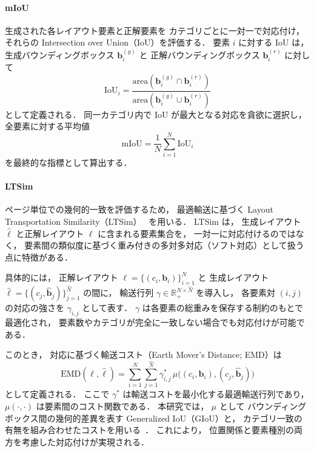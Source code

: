 \documentclass[a4j,12pt,dvipdfmx]{jsreport}
\begin{document}
\paragraph{mIoU}
生成された各レイアウト要素と正解要素を
カテゴリごとに一対一で対応付け，
それらの Intersection over Union（IoU）を評価する．
要素 $i$ に対する IoU は，
生成バウンディングボックス $\mathbf{b}_i^{(g)}$ と
正解バウンディングボックス $\mathbf{b}_i^{(r)}$ に対して
\begin{equation}
  \mathrm{IoU}_i
  =
  \frac{
    \mathrm{area}
    \left(
    \mathbf{b}_i^{(g)} \cap \mathbf{b}_i^{(r)}
    \right)
  }{
    \mathrm{area}
    \left(
    \mathbf{b}_i^{(g)} \cup \mathbf{b}_i^{(r)}
    \right)
  }
\end{equation}
として定義される．
同一カテゴリ内で IoU が最大となる対応を貪欲に選択し，
全要素に対する平均値
\begin{equation}
  \mathrm{mIoU}
  =
  \frac{1}{N}
  \sum_{i=1}^{N} \mathrm{IoU}_i
\end{equation}
を最終的な指標として算出する．

\paragraph{LTSim}
ページ単位での幾何的一致を評価するため，
最適輸送に基づく Layout Transportation Similarity（LTSim）~\cite{otani_ltsim_2024} を用いる．
LTSim は，
生成レイアウト $\hat{\ell}$ と正解レイアウト $\ell$ に含まれる要素集合を，
一対一に対応付けるのではなく，
要素間の類似度に基づく重み付きの多対多対応（ソフト対応）として扱う点に特徴がある．

具体的には，
正解レイアウト $\ell=\{(c_i,\mathbf{b}_i)\}_{i=1}^{N}$ と
生成レイアウト $\hat{\ell}=\{(c_j,\hat{\mathbf{b}}_j)\}_{j=1}^{\hat{N}}$
の間に，
輸送行列 $\gamma \in \mathbb{R}_{+}^{N \times \hat{N}}$ を導入し，
各要素対 $(i,j)$ の対応の強さを $\gamma_{i,j}$ として表す．
$\gamma$ は各要素の総重みを保存する制約のもとで最適化され，
要素数やカテゴリが完全に一致しない場合でも対応付けが可能である．

このとき，
対応に基づく輸送コスト（Earth Mover's Distance; EMD）は
\begin{equation}
  \mathrm{EMD}(\ell,\hat{\ell})
  =
  \sum_{i=1}^{N}\sum_{j=1}^{\hat{N}}
  \gamma^\ast_{i,j}\,
  \mu\bigl((c_i,\mathbf{b}_i),(c_j,\hat{\mathbf{b}}_j)\bigr)
\end{equation}
として定義される．
ここで $\gamma^\ast$ は輸送コストを最小化する最適輸送行列であり，
$\mu(\cdot,\cdot)$ は要素間のコスト関数である．
本研究では，
$\mu$ として
バウンディングボックス間の幾何的差異を表す Generalized IoU（GIoU）と，
カテゴリ一致の有無を組み合わせたコストを用いる~\cite{otani_ltsim_2024}．
これにより，
位置関係と要素種別の両方を考慮した対応付けが実現される．
\end{document}
